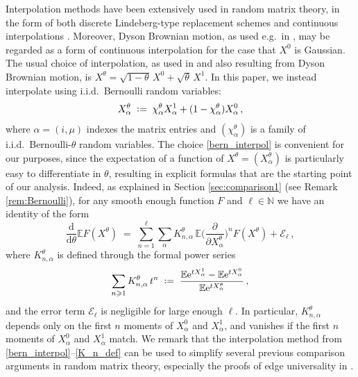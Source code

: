 \documentclass[11pt]{article} %
\numberwithin{equation}{section}
\numberwithin{figure}{section}
\theoremstyle{plain} %
\theoremstyle{definition} %
\renewcommand{\cal}{\mathcal}
\newcommand{\E}{\mathbb{E}}
\newcommand{\N}{\mathbb{N}}
\newcommand{\me}{\mathrm{e}}
\newcommand{\dd}{\mathrm{d}}
\newcommand*{\deq}{\mathrel{\vcenter{\baselineskip0.65ex \lineskiplimit0pt \hbox{.}\hbox{.}}}=}
\renewcommand{\geq}{\geqslant}
\newcommand{\pbb}[1]{\biggl({#1}\biggr)}
\begin{document}
Interpolation methods have been extensively used in random matrix theory, in the form of both discrete Lindeberg-type replacement schemes \cite{Chat, TV1, EYY1, EYY3} and continuous interpolations \cite{SL,LSY,LP}. Moreover, Dyson Brownian motion, as used e.g.\ in \cite{SL,LSY,ESY4,ESYY}, may be regarded as a form of continuous interpolation for the case that $X^0$ is Gaussian. The usual choice of interpolation, as used in \cite{SL,LP} and also resulting from Dyson Brownian motion, is $X^\theta = \sqrt{1 - \theta} \, X^0 + \sqrt{\theta} \, X^1$. In this paper, we instead interpolate using i.i.d.\ Bernoulli random variables:
\begin{equation} \label{bern_interpol}
X^\theta_{\alpha} \;\deq\; \chi^\theta_\alpha X_\alpha^1 + (1 - \chi^\theta_\alpha) X_\alpha^0\,,
\end{equation}
where $\alpha = (i, \mu)$ indexes the matrix entries and $(\chi^\theta_\alpha)$ is a family of i.i.d.\ Bernoulli-$\theta$ random variables. The choice \eqref{bern_interpol} is convenient for our purposes, since the expectation of a function of $X^\theta = (X_\alpha^\theta)$ is particularly easy to differentiate in $\theta$, resulting in explicit formulas that are the starting point of our analysis.
Indeed, as explained in Section \ref{sec:comparison1} (see Remark \ref{rem:Bernoulli}), for any smooth enough function $F$ and $\ell \in \N$ we have an identity of the form
\begin{equation} \label{interpol25}
\frac{\dd}{\dd \theta} \E F (X^\theta) \;=\;  \sum_{n = 1}^{\ell}  \sum_{\alpha} K_{n,\alpha}^\theta \, \E \pbb{\frac{\partial}{\partial X^\theta_{\alpha}}}^n F (X^\theta) + \cal E_{\ell}\,,
\end{equation}
where $K_{n,\alpha}^\theta$ is defined through the formal power series
\begin{equation} \label{K_n_def}
\sum_{n \geq 1} K_{n,\alpha}^\theta \, t^n \;\deq\; \frac{\E \me^{t X_\alpha^1} - \E \me^{t X_\alpha^0}}{\E \me^{t X_\alpha^\theta}}\,,
\end{equation}
and the error term $\cal E_{\ell}$ is negligible for large enough $\ell$.
In particular, $K_{n,\alpha}^\theta$ depends only on the first $n$ moments of $X^0_\alpha$ and $ X^1_\alpha$, and vanishes if the first $n$ moments of $X^0_\alpha$ and $X^1_\alpha$ match. We remark that the interpolation method from \eqref{bern_interpol}--\eqref{K_n_def} can be used to simplify several previous comparison arguments in random matrix theory, especially the proofs of edge universality in \cite{EYY3,EKYY2}.
\end{document}
